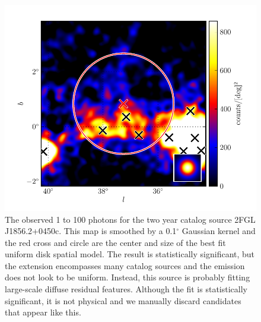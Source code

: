 \documentclass[12pt,preprint]{aastex}
\newcommand{\gev}{\text{GeV}\xspace}
\renewcommand{\deg}{\ensuremath{^\circ}\xspace}
\begin{document}
\clearpage
\begin{figure}
  \begin{center}
    \includegraphics{source_plots/example_bad_fit.pdf}
    \caption{
    The observed 1 \gev to 100 \gev photons for the two year catalog
    source 2FGL J1856.2+0450c. This map is smoothed by a 0.1\deg Gaussian
    kernel and the red cross and circle are the center and size of the
    best fit uniform disk spatial model. The result is statistically
    significant, but the extension encompasses many catalog sources and
    the emission does not look to be uniform. Instead, this source is
    probably fitting large-scale diffuse residual features. Although the
    fit is statistically significant, it is not physical and we manually
    discard candidates that appear like this.
    }
    \label{example_bad_fit}
  \end{center}
\end{figure}
\end{document}
